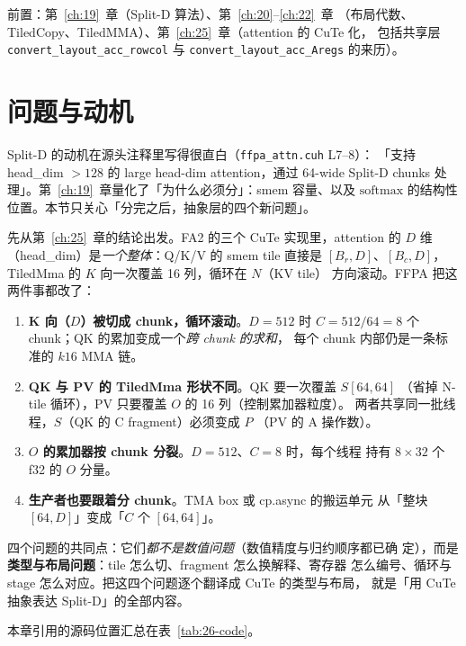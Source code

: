 前置：第~\ref{ch:19}~章（Split-D 算法）、第~\ref{ch:20}--\ref{ch:22}~章
（布局代数、TiledCopy、TiledMMA）、第~\ref{ch:25}~章（attention 的 CuTe 化，
包括共享层 \texttt{convert\_\allowbreak{}layout\_\allowbreak{}acc\_\allowbreak{}rowcol} 与 \texttt{convert\_\allowbreak{}layout\_\allowbreak{}acc\_\allowbreak{}Aregs}
的来历）。

\section{问题与动机}

Split-D 的动机在源头注释里写得很直白（\texttt{ffpa\_\allowbreak{}attn.\allowbreak{}cuh} L7--8）：
「支持 head\_dim $>128$ 的 large head-dim attention，通过 64-wide Split-D
chunks 处理」。第~\ref{ch:19}~章量化了「为什么必须分」：smem 容量、以及
$\mathrm{softmax}$ 的结构性位置。本节只关心「分完之后，抽象层的四个新问题」。

先从第~\ref{ch:25}~章的结论出发。FA2 的三个 CuTe 实现里，attention 的
$D$ 维（head\_dim）是\emph{一个整体}：Q/K/V 的 smem tile 直接是
$[B_r, D]$、$[B_c, D]$，TiledMma 的 $K$ 向一次覆盖 16 列，循环在 $N$（KV tile）
方向滚动。FFPA 把这两件事都改了：

\begin{enumerate}[itemsep=3pt,topsep=3pt]
  \item \textbf{K 向（$D$）被切成 chunk，循环滚动}。$D=512$ 时
        $C = 512/64 = 8$ 个 chunk；QK 的累加变成一个\emph{跨 chunk 的求和}，
        每个 chunk 内部仍是一条标准的 $k16$ MMA 链。
  \item \textbf{QK 与 PV 的 TiledMma 形状不同}。QK 要一次覆盖 $S[64,64]$
        （省掉 N-tile 循环），PV 只要覆盖 $O$ 的 16 列（控制累加器粒度）。
        两者共享同一批线程，$S$（QK 的 C fragment）必须变成 $P$
        （PV 的 A 操作数）。
  \item \textbf{$O$ 的累加器按 chunk 分裂}。$D=512$、$C=8$ 时，每个线程
        持有 $8\times32$ 个 f32 的 $O$ 分量。
  \item \textbf{生产者也要跟着分 chunk}。TMA box 或 cp.async 的搬运单元
        从「整块 $[64,D]$」变成「$C$ 个 $[64,64]$」。
\end{enumerate}

四个问题的共同点：它们\emph{都不是数值问题}（数值精度与归约顺序都已确
定），而是\textbf{类型与布局问题}：tile 怎么切、fragment 怎么换解释、寄存器
怎么编号、循环与 stage 怎么对应。把这四个问题逐个翻译成 CuTe 的类型与布局，
就是「用 CuTe 抽象表达 Split-D」的全部内容。

本章引用的源码位置汇总在表~\ref{tab:26-code}。

